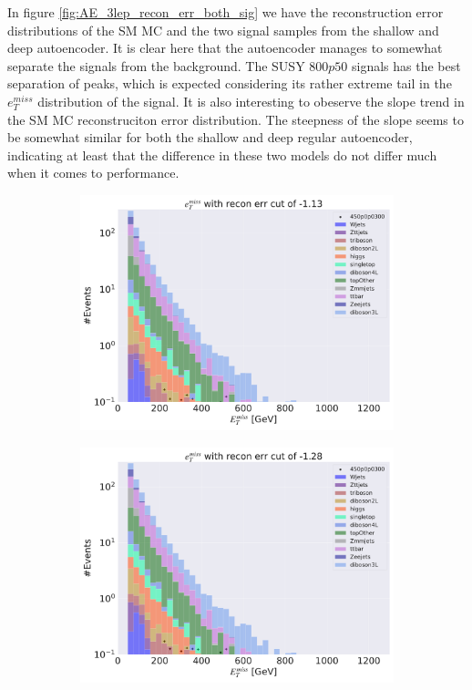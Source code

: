 In figure \ref{fig:AE_3lep_recon_err_both_sig} we have the reconstruction error distributions of the SM MC and the 
two signal samples from the shallow and deep autoencoder. It is clear here that the autoencoder manages to somewhat 
separate the signals from the background. The SUSY $800p50$ signals has the best separation of peaks, which is expected
considering its rather extreme tail in the $e_T^{miss}$ distribution of the signal. It is also interesting to obeserve 
the slope trend in the SM MC reconstruciton error distribution. The steepness of the slope seems to be somewhat similar 
for both the shallow and deep regular autoencoder, indicating at least that the difference in these two models do 
not differ much when it comes to performance. 



\begin{figure}[H]
    \centering
    \begin{subfigure}{.45\textwidth}
        \includegraphics[width=\textwidth]{Figures/AE_testing/big/3lep/b_data_recon_big_rm3_feats_sig_450p0p0300_etmiss_recon_errcut_-1.13.pdf}
        \caption{ }
        \label{fig:AE_3lep_big_450_cut_etmiss}
    \end{subfigure}
    \hfill
    \begin{subfigure}{.45\textwidth}
        \includegraphics[width=\textwidth]{Figures/AE_testing/small/3lep/b_data_recon_big_rm3_feats_sig_450p0p0300_etmiss_recon_errcut_-1.28.pdf}

\end{subfigure}
\end{figure}
